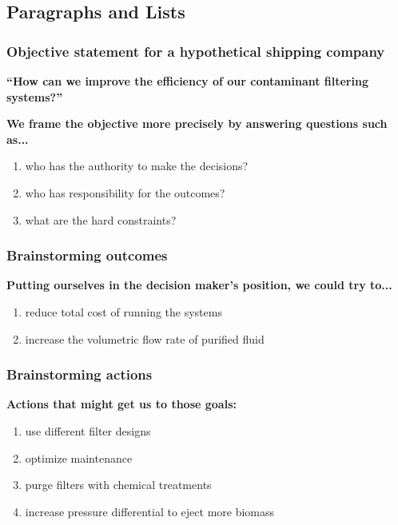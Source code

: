 \documentclass[
	11pt, %
]{beamer}
\begin{document}

\subsection{Paragraphs and Lists}

\begin{frame}
	\frametitle{Objective statement for a hypothetical shipping company}

	\textbf{``How can we improve the efficiency of our contaminant filtering systems?''}

	\bigskip

	\textbf{We frame the objective more precisely by answering questions such as...}

	\begin{enumerate}
	 \item who has the authority to make the decisions?
	 \item who has responsibility for the outcomes?
	 \item what are the hard constraints?
	\end{enumerate}


\end{frame}

\begin{frame}
	\frametitle{Brainstorming outcomes}

	\textbf{Putting ourselves in the decision maker's position, we could try to...}

	\begin{enumerate}
	\item reduce total cost of running the systems
	\item increase the volumetric flow rate of purified fluid
	\end{enumerate}


\end{frame}
\begin{frame}
	\frametitle{Brainstorming actions}

	\textbf{Actions that might get us to those goals:}

	\begin{enumerate}
	 \item use different filter designs
	 \item optimize maintenance
	 \item purge filters with chemical treatments
	 \item increase pressure differential to eject more biomass
	\end{enumerate}


\end{frame}
\end{document}
